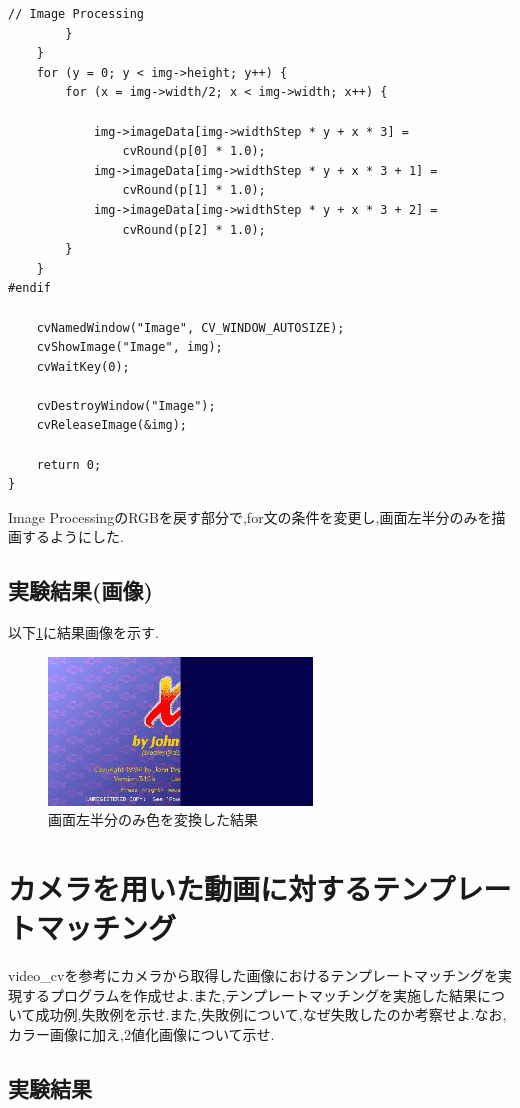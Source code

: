 \documentclass{jarticle}
\begin{document}
\begin{lstlisting}[caption = 画像を左半分のみ色を変換するプログラム,label=code:cvkadai01]
			// Image Processing
		}
	}
	for (y = 0; y < img->height; y++) {
		for (x = img->width/2; x < img->width; x++) {

			img->imageData[img->widthStep * y + x * 3] =
				cvRound(p[0] * 1.0);
			img->imageData[img->widthStep * y + x * 3 + 1] =
				cvRound(p[1] * 1.0);
			img->imageData[img->widthStep * y + x * 3 + 2] =
				cvRound(p[2] * 1.0);
		}
	}
#endif

	cvNamedWindow("Image", CV_WINDOW_AUTOSIZE);
	cvShowImage("Image", img);
	cvWaitKey(0);

	cvDestroyWindow("Image");
	cvReleaseImage(&img);

	return 0;
}
\end{lstlisting}
Image ProcessingのRGBを戻す部分で,for文の条件を変更し,画面左半分のみを描画するようにした.
\subsection{実験結果(画像)}
以下\ref{fig:cvkadai01}に結果画像を示す.

\begin{figure}[H]
\begin{center}
\includegraphics[width=7.0cm]{cv_kadai01/image.png}
\caption{画面左半分のみ色を変換した結果}
\label{fig:cvkadai01}
\end{center}
\end{figure}


\section{カメラを用いた動画に対するテンプレートマッチング}
video_cvを参考にカメラから取得した画像におけるテンプレートマッチングを実現するプログラムを作成せよ.また,テンプレートマッチングを実施した結果について成功例,失敗例を示せ.また,失敗例について,なぜ失敗したのか考察せよ.なお,カラー画像に加え,2値化画像について示せ.
\subsection{実験結果}
\end{document}
